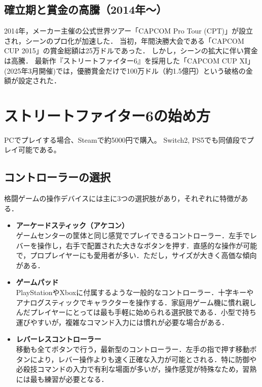 \documentclass[twocolumn, a4paper]{Zemiresume}
\begin{document}
\subsection{確立期と賞金の高騰（2014年〜）}
2014年，メーカー主催の公式世界ツアー「CAPCOM Pro Tour (CPT)」が設立され，シーンのプロ化が加速した．
当初，年間決勝大会である「CAPCOM CUP 2015」の賞金総額は25万ドルであった\cite{cite:capcomcup_history}．
しかし，シーンの拡大に伴い賞金は高騰．
最新作『ストリートファイター6』を採用した「CAPCOM CUP XI」(2025年3月開催)では，優勝賞金だけで100万ドル（約1.5億円）という破格の金額が設定された\cite{cite:capcom_million}．


\section{ストリートファイター6の始め方}
PCでプレイする場合、Steamで約5000円で購入。
Switch2, PS5でも同値段でプレイ可能である。

\subsection{コントローラーの選択}
格闘ゲームの操作デバイスには主に3つの選択肢があり，それぞれに特徴がある．
\begin{itemize}
    \item \textbf{アーケードスティック（アケコン）} \\
    ゲームセンターの筐体と同じ感覚でプレイできるコントローラー．左手でレバーを操作し，右手で配置された大きなボタンを押す．直感的な操作が可能で，プロプレイヤーにも愛用者が多い．ただし，サイズが大きく高価な傾向がある．

    \item \textbf{ゲームパッド} \\
    PlayStationやXboxに付属するような一般的なコントローラー．十字キーやアナログスティックでキャラクターを操作する．家庭用ゲーム機に慣れ親しんだプレイヤーにとっては最も手軽に始められる選択肢である．小型で持ち運びやすいが，複雑なコマンド入力には慣れが必要な場合がある．

    \item \textbf{レバーレスコントローラー} \\
    移動も全てボタンで行う，最新型のコントローラー．左手の指で押す移動ボタンにより，レバー操作よりも速く正確な入力が可能とされる．特に防御や必殺技コマンドの入力で有利な場面が多いが，操作感覚が特殊なため，習熟には最も練習が必要となる．
\end{itemize}
\end{document}
